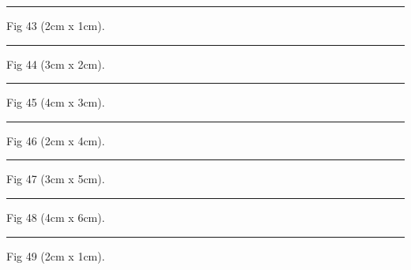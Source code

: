 \documentclass[a4paper,11pt]{article}
\begin{document}
\begin{swarmwrap}%
  \begin{minipage}[t]{2cm}
    \centering
    \rule{\linewidth}{1cm}
    {\footnotesize Fig 43 (2cm x 1cm).}
  \end{minipage}%
\end{swarmwrap}%
\swarmwrapnext
\lipsum[43]%

\begin{swarmwrap}%
  \begin{minipage}[t]{3cm}
    \centering
    \rule{\linewidth}{2cm}
    {\footnotesize Fig 44 (3cm x 2cm).}
  \end{minipage}%
\end{swarmwrap}%
\swarmwrapnext
\lipsum[44]%

\begin{swarmwrap}%
  \begin{minipage}[t]{4cm}
    \centering
    \rule{\linewidth}{3cm}
    {\footnotesize Fig 45 (4cm x 3cm).}
  \end{minipage}%
\end{swarmwrap}%
\swarmwrapnext
\lipsum[45]%

\begin{swarmwrap}%
  \begin{minipage}[t]{2cm}
    \centering
    \rule{\linewidth}{4cm}
    {\footnotesize Fig 46 (2cm x 4cm).}
  \end{minipage}%
\end{swarmwrap}%
\swarmwrapnext
\lipsum[46]%

\begin{swarmwrap}%
  \begin{minipage}[t]{3cm}
    \centering
    \rule{\linewidth}{5cm}
    {\footnotesize Fig 47 (3cm x 5cm).}
  \end{minipage}%
\end{swarmwrap}%
\swarmwrapnext
\lipsum[47]%

\begin{swarmwrap}%
  \begin{minipage}[t]{4cm}
    \centering
    \rule{\linewidth}{6cm}
    {\footnotesize Fig 48 (4cm x 6cm).}
  \end{minipage}%
\end{swarmwrap}%
\swarmwrapnext
\lipsum[48]%

\begin{swarmwrap}%
  \begin{minipage}[t]{2cm}
    \centering
    \rule{\linewidth}{1cm}
    {\footnotesize Fig 49 (2cm x 1cm).}
  \end{minipage}%
\end{swarmwrap}%
\swarmwrapnext
\lipsum[49]%
\end{document}

